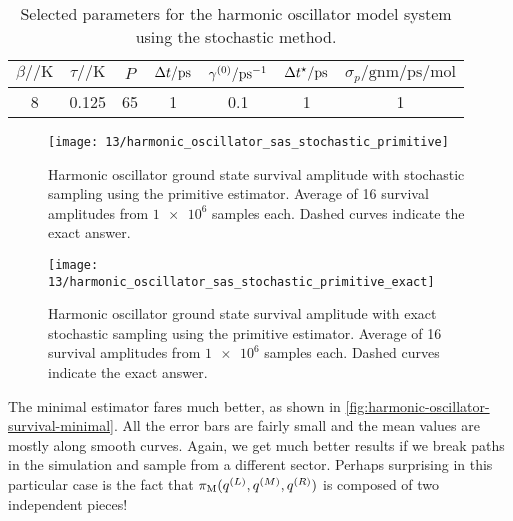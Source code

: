\begin{table}
	\begin{center}
	\begin{tabular}{ c c c c c c c }
		\toprule
		{$\beta / \si{\per\kelvin}$} & {$\tau / \si{\per\kelvin}$} & {$P$} & {$\dt / \si{\pico\second}$} & $\gamma\bead{0} / \si{\per\pico\second}$ & {$\dt\alt / \si{\pico\second}$} & {$\sigma_p / \si{\gram\nano\meter\per\pico\second\per\mole}$} \\
		\midrule
		8 & 0.125 & 65 & 1 & 0.1 & 1 & 1 \\
		\bottomrule
	\end{tabular}
	\end{center}
	\caption[
		Selected parameters for harmonic oscillator (stochastic)
	]{
		Selected parameters for the harmonic oscillator model system using the stochastic method.
	}
	\label{tab:model-sas-harmonic-oscillator-stochastic}
\end{table}

\begin{figure}
	\centering
	\texttt{[image: 13/harmonic\_oscillator\_sas\_stochastic\_primitive]}
	\caption[
		Harmonic oscillator survival amplitude using primitive estimator
	]{
		Harmonic oscillator ground state survival amplitude with stochastic sampling using the primitive estimator.
		Average of 16 survival amplitudes from $\num{1e6}$ samples each.
		Dashed curves indicate the exact answer.
	}
	\label{fig:harmonic-oscillator-survival-primitive}
\end{figure}

\begin{figure}
	\centering
	\texttt{[image: 13/harmonic\_oscillator\_sas\_stochastic\_primitive\_exact]}
	\caption[
		Harmonic oscillator survival amplitude using primitive estimator (exact sampling)
	]{
		Harmonic oscillator ground state survival amplitude with exact stochastic sampling using the primitive estimator.
		Average of 16 survival amplitudes from $\num{1e6}$ samples each.
		Dashed curves indicate the exact answer.
	}
	\label{fig:harmonic-oscillator-survival-primitive-exact}
\end{figure}

The minimal estimator fares much better, as shown in \cref{fig:harmonic-oscillator-survival-minimal}.
All the error bars are fairly small and the mean values are mostly along smooth curves.
Again, we get much better results if we break paths in the simulation and sample from a different sector.
Perhaps surprising in this particular case is the fact that $\pi_\mathrm{M}(q^{(L)}, q^{(M)}, q^{(R)})$ is composed of two independent pieces!

